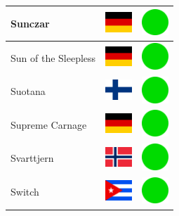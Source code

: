 \documentclass[12pt, a4paper, twoside]{report}
\begin{document}
\begin{center}
\begin{longtable}{|p{5cm}|p{2cm}|p{2cm}|}
 Sunczar                                                    & \includegraphics[width=1cm]{../4x3/de} &   \includegraphics[width=1cm]{../likes/y} \\ \hline
 Sun of the Sleepless                                       & \includegraphics[width=1cm]{../4x3/de} &   \includegraphics[width=1cm]{../likes/y} \\ \hline
 Suotana                                                    & \includegraphics[width=1cm]{../4x3/fi} &   \includegraphics[width=1cm]{../likes/y} \\ \hline
 Supreme Carnage                                            & \includegraphics[width=1cm]{../4x3/de} &   \includegraphics[width=1cm]{../likes/y} \\ \hline
 Svarttjern                                                 & \includegraphics[width=1cm]{../4x3/no} &   \includegraphics[width=1cm]{../likes/y} \\ \hline
 Switch                                                     & \includegraphics[width=1cm]{../4x3/cu} &   \includegraphics[width=1cm]{../likes/y} \\ \hline

\end{longtable}
\end{center}
\end{document}
